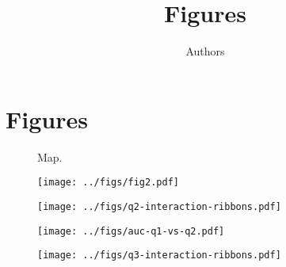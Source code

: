 \documentclass[11pt,english]{article}
\title{Figures}
\author{
Authors
}
\begin{document}
\maketitle






\section{Figures}

\begin{figure}[htb]
  \begin{center}
    \caption{Map.
    }
    \label{fig:}
  \end{center}
\end{figure}

\clearpage

\begin{figure}[htb]
  \begin{center}
    \texttt{[image: ../figs/fig2.pdf]}
    \caption{
    }
    \label{fig:}
  \end{center}
\end{figure}

\begin{figure}[htb]
  \begin{center}
    \texttt{[image: ../figs/q2-interaction-ribbons.pdf]}
    \caption{
    }
    \label{fig:}
  \end{center}
\end{figure}

\clearpage

\begin{figure}[htb]
  \begin{center}
    \texttt{[image: ../figs/auc-q1-vs-q2.pdf]}
    \caption{
    }
    \label{fig:}
  \end{center}
\end{figure}

\begin{figure}[htb]
  \begin{center}
    \texttt{[image: ../figs/q3-interaction-ribbons.pdf]}
    \caption{
    }
    \label{fig:}
  \end{center}
\end{figure}
\end{document}
